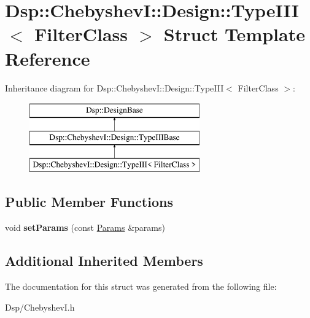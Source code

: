 \hypertarget{structDsp_1_1ChebyshevI_1_1Design_1_1TypeIII}{\section{Dsp\-:\-:Chebyshev\-I\-:\-:Design\-:\-:Type\-I\-I\-I$<$ Filter\-Class $>$ Struct Template Reference}
\label{structDsp_1_1ChebyshevI_1_1Design_1_1TypeIII}
}
Inheritance diagram for Dsp\-:\-:Chebyshev\-I\-:\-:Design\-:\-:Type\-I\-I\-I$<$ Filter\-Class $>$\-:\begin{figure}[H]
\begin{center}
\leavevmode
\includegraphics[height=3.000000cm]{structDsp_1_1ChebyshevI_1_1Design_1_1TypeIII}
\end{center}
\end{figure}
\subsection*{Public Member Functions}
\begin{DoxyCompactItemize}
\item 
\hypertarget{structDsp_1_1ChebyshevI_1_1Design_1_1TypeIII_a8c8b84fd6b09c9059d06c56caa659841}{void {\bfseries set\-Params} (const \hyperlink{structDsp_1_1Params}{Params} \&params)}\label{structDsp_1_1ChebyshevI_1_1Design_1_1TypeIII_a8c8b84fd6b09c9059d06c56caa659841}

\end{DoxyCompactItemize}
\subsection*{Additional Inherited Members}


The documentation for this struct was generated from the following file\-:\begin{DoxyCompactItemize}
\item 
Dsp/Chebyshev\-I.\-h\end{DoxyCompactItemize}
